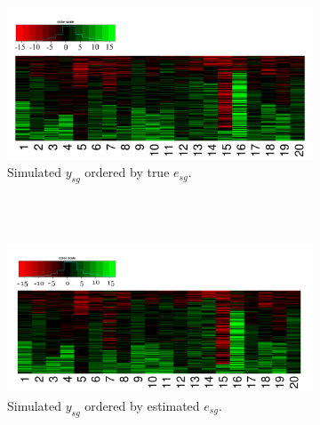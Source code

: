 

\begin{figure}[H]
    \centering
    \begin{subfigure}[b]{0.98\textwidth}
        \centering
        \includegraphics[scale = 0.3]{./veera/true_y_heatmap_sim_final.png}
        \caption{Simulated $y_{sg}$ ordered by true $e_{sg}$.}
        \vspace{0.5 cm}
    \end{subfigure}\\
    ~
    \begin{subfigure}[b]{0.98\textwidth}
        \centering
        \includegraphics[scale = 0.3]{./veera/estimated_y_heatmap_sim_final.png}
        \caption{Simulated $y_{sg}$ ordered by estimated $e_{sg}$.}
        \vspace{0.5 cm}
    \end{subfigure}\\
    ~ 
    \begin{subfigure}[b]{0.98\textwidth}

\end{subfigure}
\end{figure}
